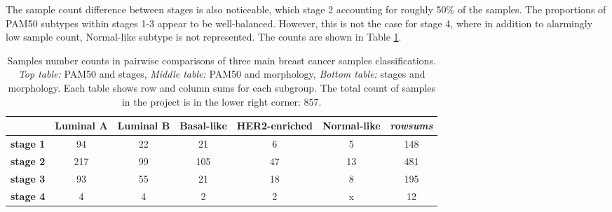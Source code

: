     The sample count difference between stages is also noticeable, which stage 2 accounting for roughly 50\% of the samples. The proportions of PAM50 subtypes within stages 1-3 appear to be well-balanced. However, this is not the case for stage 4, where in addition to alarmingly low sample count, Normal-like subtype is not represented. The counts are shown in Table \ref{table:counts}.  \\
        
        
                \begin{table}[!h]
                \centering
                \tiny
                \caption[Sample counts per each pairwise subgroup in the dataset]{Samples number counts in pairwise comparisons of three main breast cancer samples classifications. \textit{Top table:} PAM50 and stages,\textit{ Middle table:} PAM50 and morphology, \textit{Bottom table:} stages and morphology. Each table shows row and column sums for each subgroup. The total count of samples in the project is in the lower right corner: 857.}
                \label{table:counts}      
                \begin{tabular}{ccccccc}
                \multicolumn{1}{l|}{} & \multicolumn{1}{c|}{\textbf{Luminal A}} & \multicolumn{1}{c|}{\textbf{Luminal B}} & \multicolumn{1}{c|}{\textbf{Basal-like}} & \multicolumn{1}{c|}{\textbf{HER2-enriched}} & \multicolumn{1}{c|}{\textbf{Normal-like}} & {\color[HTML]{9B9B9B} \textit{rowsums}} \\ \hline
                \multicolumn{1}{c|}{\textbf{stage 1}} & \multicolumn{1}{c|}{94} & \multicolumn{1}{c|}{22} & \multicolumn{1}{c|}{21} & \multicolumn{1}{c|}{6} & \multicolumn{1}{c|}{5} & \multicolumn{1}{c|}{{\color[HTML]{656565} 148}} \\ \hline
                \multicolumn{1}{c|}{\textbf{stage 2}} & \multicolumn{1}{c|}{217} & \multicolumn{1}{c|}{99} & \multicolumn{1}{c|}{105} & \multicolumn{1}{c|}{47} & \multicolumn{1}{c|}{13} & \multicolumn{1}{c|}{{\color[HTML]{656565} 481}} \\ \hline
                \multicolumn{1}{c|}{\textbf{stage 3}} & \multicolumn{1}{c|}{93} & \multicolumn{1}{c|}{55} & \multicolumn{1}{c|}{21} & \multicolumn{1}{c|}{18} & \multicolumn{1}{c|}{8} & \multicolumn{1}{c|}{{\color[HTML]{656565} 195}} \\ \hline
                \multicolumn{1}{c|}{\textbf{stage 4}} & \multicolumn{1}{c|}{4} & \multicolumn{1}{c|}{4} & \multicolumn{1}{c|}{2} & \multicolumn{1}{c|}{2} & \multicolumn{1}{c|}{{\color[HTML]{C0C0C0} x}} & \multicolumn{1}{c|}{{\color[HTML]{656565} 12}} \\ \hline

\end{tabular}
\end{table}
